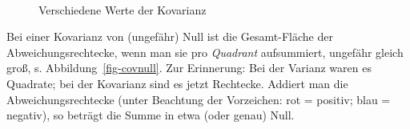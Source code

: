 \documentclass[
  letterpaper,
  twoside,
  open=any]{scrbook}
\theoremstyle{definition}
\theoremstyle{definition}
\theoremstyle{definition}
\theoremstyle{remark}
\begin{document}
\begin{figure}

\begin{minipage}{0.45\linewidth}



\end{minipage}%
%
\begin{minipage}{0.10\linewidth}
~\end{minipage}%
%
\begin{minipage}{0.45\linewidth}



\end{minipage}%

\caption{\label{fig-demos-cov}Verschiedene Werte der Kovarianz}

\end{figure}%

Bei einer Kovarianz von (ungefähr) Null ist die Gesamt-Fläche der
Abweichungsrechtecke, wenn man sie pro \emph{Quadrant} aufsummiert,
ungefähr gleich groß, s. Abbildung~\ref{fig-covnull}. Zur Erinnerung:
Bei der Varianz waren es Quadrate; bei der Kovarianz sind es jetzt
Rechtecke. Addiert man die Abweichungsrechtecke (unter Beachtung der
Vorzeichen: rot = positiv; blau = negativ), so beträgt die Summe in etwa
(oder genau) Null.
\end{document}
